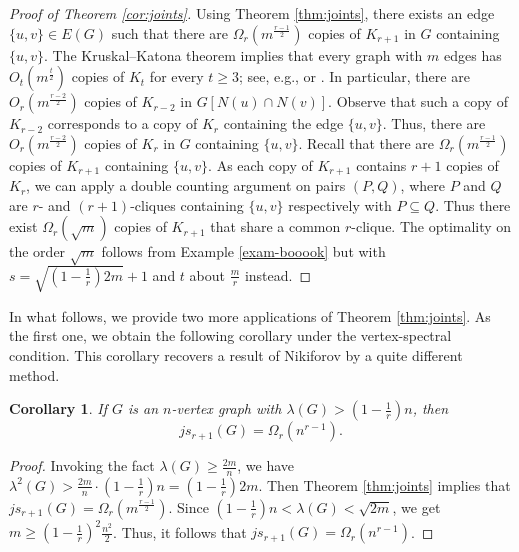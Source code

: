 \documentclass[11pt,a4paper]{article}
\newtheorem{cor}[theorem]{Corollary}
\theoremstyle{definition}
\theoremstyle{remark}
\begin{document}
\begin{proof}[Proof of Theorem \ref{cor:joints}]
    Using Theorem \ref{thm:joints}, there exists an edge $\{u,v\}\in E(G)$ such that there are 
     $\Omega_r(m^{\frac{r-1}{2}})$ copies of $K_{r+1}$ in $G$ containing $\{u,v\}$. 
    The Kruskal--Katona theorem 
    implies that every 
    graph with $m$ edges has  $O_t(m^{\frac{t}{2}})$ copies of $K_t$ for every $t\ge 3$; see, e.g., \cite[p. 304]{Bol1978} 
    or \cite{Alon1981}. 
    In particular, 
    there are $O_r(m^{\frac{r-2}{2}})$ copies of $K_{r-2}$ in 
    $G[N(u)\cap N(v)]$. Observe that such a copy of 
    $K_{r-2}$ corresponds to a copy of $K_r$ containing 
    the edge $\{u,v\}$. 
    Thus, 
    there are $O_r(m^{\frac{r-2}{2}})$ copies of $K_r$ in $G$ containing $\{u,v\}$.  
    Recall that there are $\Omega_r(m^{\frac{r-1}{2}})$ copies of 
    $K_{r+1}$ containing $\{u,v\}$. As 
    each copy of $K_{r+1}$ contains $r+1$ copies of $K_r$, we can apply a double counting argument on pairs $(P,Q)$, where $P$ and $Q$ are $r$- and $(r + 1)$-cliques containing $\{u,v\}$ respectively with $P\subseteq Q$. Thus there exist $\Omega_r(\sqrt{m})$ copies of $K_{r+1}$ that share a common $r$-clique. The optimality on the order $\sqrt{m}$ follows from Example \ref{exam-booook} but with $s=\sqrt{(1-\frac{1}{r})2m} +1$ and $t$ about $\frac{m}{r}$ instead.
\end{proof}


In what follows, we provide two more applications of Theorem \ref{thm:joints}. 
As the first one, we obtain the following corollary under the vertex-spectral condition. This corollary recovers a result of Nikiforov \cite{Niki2009ejc} by a quite different method.

\begin{cor}\label{cor:jsr}
    If $G$ is an $n$-vertex graph with 
    $\lambda (G)> (1- \frac{1}{r})n$, 
    then 
    \[ js_{r+1}(G)=\Omega_r(n^{r-1}). \]  
\end{cor}

\begin{proof}
Invoking the fact $\lambda (G)\ge \frac{2m}{n}$, 
we have $\lambda^2(G)
> \frac{2m}{n} \cdot (1- \frac{1}{r})n = (1-\frac{1}{r})2m$. 
Then Theorem \ref{thm:joints} implies that 
$js_{r+1}(G)=\Omega_r(m^{\frac{r-1}{2}})$. 
Since $(1-\frac{1}{r})n < \lambda (G)< \sqrt{2m}$,  
we get $m\ge (1-\frac{1}{r})^2\frac{n^2}{2}$. 
Thus, it follows that $js_{r+1}(G)=\Omega_r(n^{r-1})$. 
\end{proof}
\end{document}
